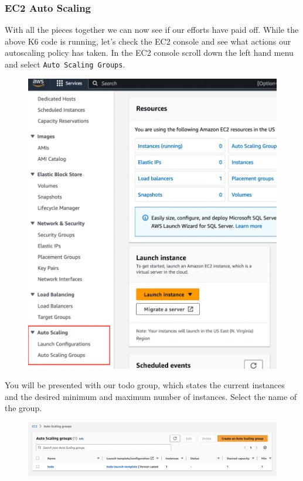 \documentclass{csse4400}
\begin{document}
\subsubsection{EC2 Auto Scaling}

With all the pieces together we can now see if our efforts have paid off.
While the above K6 code is running, let's check the EC2 console and see what actions our autoscaling policy has taken.
In the EC2 console scroll down the left hand menu and select \texttt{Auto Scaling Groups}.

\begin{figure}[H]
  \begin{center}
    \includegraphics[scale=0.5]{images/ec2_1}
  \end{center}
\end{figure}

You will be presented with our todo group, which states the current instances and the desired minimum and maximum number of instances.
Select the name of the group.

\begin{figure}[H]
  \begin{center}
    \includegraphics[width=\textwidth]{images/ec2_3}
  \end{center}
\end{figure}
\end{document}
